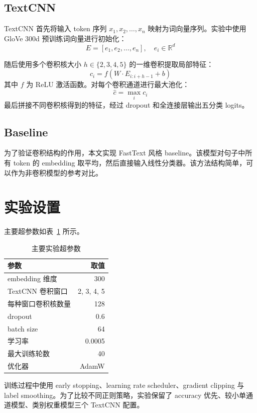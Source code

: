\documentclass[UTF8,a4paper,12pt]{ctexart}
\begin{document}
\subsection{TextCNN}

TextCNN 首先将输入 token 序列 $x_1, x_2, \dots, x_n$ 映射为词向量序列。实验中使用 GloVe 300d 预训练词向量进行初始化：
\[
E = [e_1, e_2, \dots, e_n], \quad e_i \in \mathbb{R}^d
\]

随后使用多个卷积核大小 $h \in \{2,3,4,5\}$ 的一维卷积提取局部特征：
\[
c_i = f(W \cdot E_{i:i+h-1} + b)
\]
其中 $f$ 为 ReLU 激活函数。对每个卷积通道进行最大池化：
\[
\hat{c} = \max_i c_i
\]
最后拼接不同卷积核得到的特征，经过 dropout 和全连接层输出五分类 logits。

\subsection{Baseline}

为了验证卷积结构的作用，本文实现 FastText 风格 baseline。该模型对句子中所有 token 的 embedding 取平均，然后直接输入线性分类器。该方法结构简单，可以作为非卷积模型的参考对比。

\section{实验设置}

主要超参数如表~\ref{tab:hyperparams} 所示。

\begin{table}[h]
\centering
\caption{主要实验超参数}
\label{tab:hyperparams}
\begin{tabular}{lr}
\toprule
参数 & 取值 \\
\midrule
embedding 维度 & 300 \\
TextCNN 卷积窗口 & 2, 3, 4, 5 \\
每种窗口卷积核数量 & 128 \\
dropout & 0.6 \\
batch size & 64 \\
学习率 & 0.0005 \\
最大训练轮数 & 40 \\
优化器 & AdamW \\
\bottomrule
\end{tabular}
\end{table}

训练过程中使用 early stopping、learning rate scheduler、gradient clipping 与 label smoothing。为了比较不同正则策略，实验保留了 accuracy 优先、较小单通道模型、类别权重模型三个 TextCNN 配置。
\end{document}
